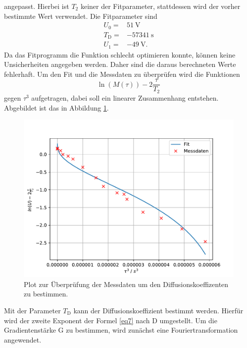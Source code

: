 angepasst.
Hierbei ist $T_{\text{2}}$ keiner der Fitparameter, stattdessen wird der vorher bestimmte Wert verwendet.
Die Fitparameter sind
\begin{align*}
  U_{\text{0}}=&\SI{51}{\volt}\\
  T_{\text{D}} =& \SI{-57341}{\second}\\
  U_{\text{1}}=&\SI{-49}{\volt}.
\end{align*}
Da das Fitprogramm die Funktion schlecht optimieren konnte, können keine Unsicherheiten angegeben werden. Daher sind 
die daraus berechneten Werte fehlerhaft.
Um den Fit und die Messdaten zu überprüfen wird die Funktionen 
\begin{equation}
  \ln{\left(M(\tau)\right)}-2\frac{\tau}{T_{2}}
\end{equation}
gegen $\tau^3$ aufgetragen, dabei soll ein linearer Zusammenhang entstehen. Abgebildet ist das in Abbildung \ref{fig:Diff_fit}.
\begin{figure}
  \centering
  \includegraphics[width=\textwidth,keepaspectratio]{figure/Diff_plot.pdf}
  \caption{Plot zur Überprüfung der Messdaten um den Diffusionskoeffizenten zu bestimmen.}
  \label{fig:Diff_fit}
\end{figure}
Mit der Parameter $T_{\text{D}}$ kann der Diffusionskoeffizient bestimmt werden. Hierfür wird der zweite Exponent der Formel \eqref{eq7}
nach D umgestellt. Um die Gradientenstärke G zu bestimmen, wird zunächst eine Fouriertransformation angewendet.
\FloatBarrier
